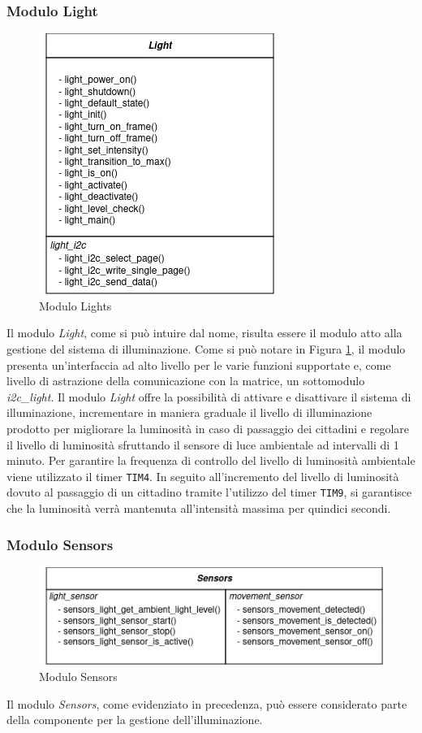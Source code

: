 \documentclass{article}
\begin{document}
	\subsubsection{Modulo Light}
	\begin{figure}[ht]
		\centering
		\includegraphics[scale=0.40]{./images/Light.jpg}
		\caption{Modulo Lights}
		\label{img:lights}
	\end{figure}
	Il modulo \textit{Light}, come si pu\`o intuire dal nome, risulta essere il modulo atto alla gestione del sistema di illuminazione. 
	Come si pu\`o notare in Figura \ref{img:lights}, il modulo presenta un'interfaccia ad alto livello per le varie funzioni supportate e, come livello di astrazione della comunicazione con la matrice, un sottomodulo \textit{i2c\_light}.
	Il modulo \textit{Light} offre la possibilit\`a di attivare e disattivare il sistema di illuminazione, incrementare in maniera graduale il livello di illuminazione prodotto per migliorare la luminosit\`a in caso di passaggio dei cittadini e regolare il livello di luminosit\`a sfruttando il sensore di luce ambientale ad intervalli di 1 minuto.
	Per garantire la frequenza di controllo del livello di luminosit\`a ambientale viene utilizzato il timer \texttt{TIM4}.
	In seguito all'incremento del livello di luminosit\`a dovuto al passaggio di un cittadino tramite l'utilizzo del timer \texttt{TIM9}, si garantisce che la luminosit\`a verr\`a mantenuta all'intensit\`a massima per quindici secondi.
	
	\subsubsection{Modulo Sensors}
	\begin{figure}[ht]
		\centering
		\includegraphics[scale=0.5]{./images/Sensors.jpg}
		\caption{Modulo Sensors}
		\label{img:sensors}
	\end{figure}
	\noindent Il modulo \textit{Sensors}, come evidenziato in precedenza, pu\`o essere considerato parte della componente per la gestione dell'illuminazione.
	
\end{document}

